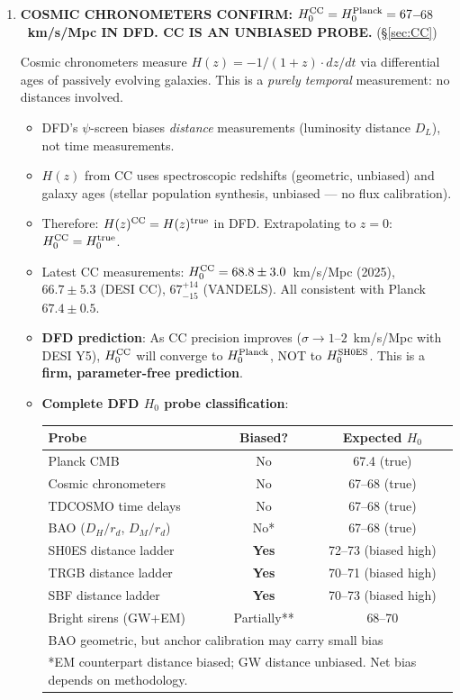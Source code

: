 \documentclass[11pt,a4paper]{article}
\begin{document}
\begin{tcolorbox}[colback=yellow!5!white, colframe=red!70!black,
  title=\textbf{W4i17 TOP 5 FINDINGS --- RANKED BY IMPACT}]
\begin{enumerate}
\item \textbf{COSMIC CHRONOMETERS CONFIRM: $H_0^{\rm CC} = H_0^{\rm Planck}
  = 67$--$68$~km/s/Mpc IN DFD.  CC IS AN UNBIASED PROBE.}
  (\S\ref{sec:CC})

  Cosmic chronometers measure $H(z) = -1/(1+z) \cdot dz/dt$ via
  differential ages of passively evolving galaxies. This is a
  \emph{purely temporal} measurement: no distances involved.
  \begin{itemize}[nosep]
  \item DFD's $\psi$-screen biases \emph{distance} measurements
    (luminosity distance $D_L$), not time measurements.
  \item $H(z)$ from CC uses spectroscopic redshifts (geometric,
    unbiased) and galaxy ages (stellar population synthesis,
    unbiased --- no flux calibration).
  \item Therefore: $H(z)^{\rm CC} = H(z)^{\rm true}$ in DFD.
    Extrapolating to $z = 0$: $H_0^{\rm CC} = H_0^{\rm true}$.
  \item Latest CC measurements: $H_0^{\rm CC} = 68.8 \pm 3.0$~km/s/Mpc
    (2025), $66.7 \pm 5.3$ (DESI CC), $67^{+14}_{-15}$ (VANDELS).
    All consistent with Planck $67.4 \pm 0.5$.
  \item \textbf{DFD prediction}: As CC precision improves
    ($\sigma \to 1$--$2$~km/s/Mpc with DESI Y5),
    $H_0^{\rm CC}$ will converge to $H_0^{\rm Planck}$, NOT to
    $H_0^{\rm SH0ES}$. This is a \textbf{firm, parameter-free prediction}.
  \item \textbf{Complete DFD $H_0$ probe classification}:
    \begin{center}
    \begin{tabular}{lcc}
    \toprule
    \textbf{Probe} & \textbf{Biased?} & \textbf{Expected $H_0$} \\
    \midrule
    Planck CMB & No & 67.4 (true) \\
    Cosmic chronometers & No & 67--68 (true) \\
    TDCOSMO time delays & No & 67--68 (true) \\
    BAO ($D_H/r_d$, $D_M/r_d$) & No* & 67--68 (true) \\
    SH0ES distance ladder & \textbf{Yes} & 72--73 (biased high) \\
    TRGB distance ladder & \textbf{Yes} & 70--71 (biased high) \\
    SBF distance ladder & \textbf{Yes} & 70--73 (biased high) \\
    Bright sirens (GW+EM) & Partially** & 68--70 \\
    \bottomrule
    \multicolumn{3}{l}{\footnotesize *BAO geometric, but anchor
      calibration may carry small bias} \\
    \multicolumn{3}{l}{\footnotesize **EM counterpart distance biased;
      GW distance unbiased. Net bias depends on methodology.}
    \end{tabular}
    \end{center}
  \end{itemize}


\end{enumerate}
\end{tcolorbox}
\end{document}
